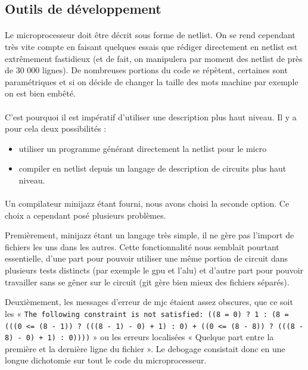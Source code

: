 \documentclass{article}
\begin{document}
\subsection{Outils de développement}

\paragraph{}Le microprocesseur doit être décrit sous forme de netlist. On se rend cependant très vite compte en faisant quelques essais que rédiger directement en netlist est extrêmement fastidieux (et de fait, on manipulera par moment des netlist de près de 30 000 lignes). De nombreuses portions du code se répètent, certaines sont paramétriques et si on décide de changer la taille des mots machine par exemple on est bien embêté.

\paragraph{}C'est pourquoi il est impératif d'utiliser une description plus haut niveau. Il y a pour cela deux possibilités :
\begin{itemize}
	\item utiliser un programme générant directement la netlist pour le micro
	\item compiler en netlist depuis un langage de description de circuits plus haut niveau.
\end{itemize}

\paragraph{}Un compilateur minijazz étant fourni, nous avons choisi la seconde option. Ce choix a cependant posé plusieurs problèmes.

Premièrement, minijazz étant un langage très simple, il ne gère pas l'import de fichiers les uns dans les autres. Cette fonctionnalité nous semblait pourtant essentielle, d'une part pour pouvoir utiliser une même portion de circuit dans plusieurs tests distincts (par exemple le gpu et l'alu) et d'autre part pour pouvoir travailler sans se gêner sur le circuit (git gère bien mieux des fichiers séparés).

Deuxièmement, les messages d'erreur de mjc étaient assez obscures, que ce soit les « \texttt{The following constraint is not satisfied: ((8 = 0) ? 1 : (8 = (((0 <= (8 - 1)) ? (((8 - 1) - 0) + 1) : 0) + ((0 <= (8 - 8)) ? (((8 - 8) - 0) + 1) : 0))))} » ou les erreurs localisées « Quelque part entre la première et la dernière ligne du fichier ». Le debogage consistait donc en une longue dichotomie sur tout le code du microprocesseur.
\end{document}
